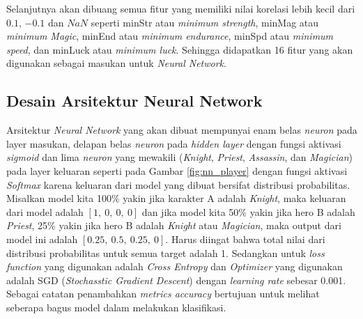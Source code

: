Selanjutnya akan dibuang semua fitur yang memiliki nilai korelasi lebih kecil dari $0.1$, $-0.1$ dan $NaN$ seperti minStr atau \textit{minimum strength}, minMag atau \textit{minimum Magic}, minEnd atau \textit{minimum endurance}, minSpd atau \textit{minimum speed}, dan minLuck atau \textit{minimum luck}. Sehingga didapatkan 16 fitur yang akan digunakan sebagai masukan untuk \textit{Neural Network}.
\vspace{1ex}

\subsection{Desain Arsitektur Neural Network}
\label{sec:sub_sec3_player_arch}
\vspace{1ex}

Arsitektur \textit{Neural Network} yang akan dibuat mempunyai enam belas \textit{neuron} pada layer masukan, delapan belas \textit{neuron} pada \textit{hidden layer} dengan fungsi aktivasi \textit{sigmoid} dan lima \textit{neuron} yang mewakili (\textit{Knight}, \textit{Priest}, \textit{Assassin}, dan \textit{Magician}) pada layer keluaran seperti pada Gambar \ref{fig:nn_player} dengan fungsi aktivasi \textit{Softmax} karena keluaran dari model yang dibuat bersifat distribusi probabilitas. Misalkan model kita 100\% yakin jika karakter A adalah \textit{Knight}, maka keluaran dari model adalah $\left[1,\ 0,\ 0,\ 0 \right]$ dan jika model kita 50\% yakin jika hero B adalah \textit{Priest}, 25\% yakin jika hero B adalah \textit{Knight} atau \textit{Magician}, maka output dari model ini adalah $\left[0.25,\ 0.5,\ 0.25, \ 0 \right]$. Harus diingat bahwa total nilai dari distribusi probabilitas untuk semua target adalah 1. Sedangkan untuk \textit{loss function} yang digunakan adalah \textit{Cross Entropy} dan \textit{Optimizer} yang digunakan adalah SGD (\textit{Stochasstic Gradient Descent}) dengan \textit{learning rate} sebesar 0.001. Sebagai catatan penambahkan \textit{metrics accuracy} bertujuan untuk melihat seberapa bagus model dalam melakukan klasifikasi.
\vspace{1ex}

